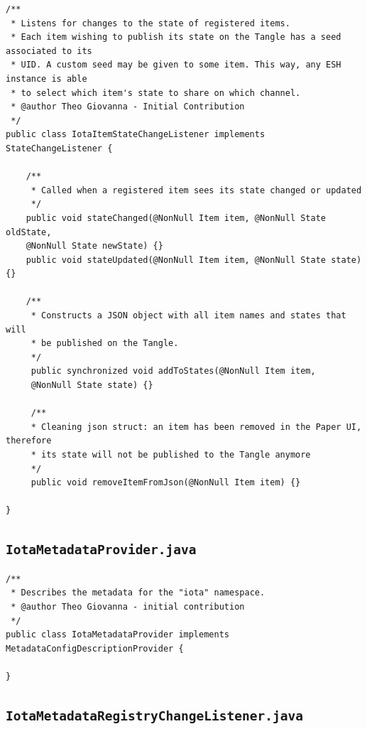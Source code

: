\documentclass[a4paper,10pt]{article}
\begin{document}
\begin{verbatim}
/**
 * Listens for changes to the state of registered items.
 * Each item wishing to publish its state on the Tangle has a seed associated to its 
 * UID. A custom seed may be given to some item. This way, any ESH instance is able 
 * to select which item's state to share on which channel.
 * @author Theo Giovanna - Initial Contribution
 */
public class IotaItemStateChangeListener implements StateChangeListener {

	/**
	 * Called when a registered item sees its state changed or updated
	 */ 
	public void stateChanged(@NonNull Item item, @NonNull State oldState, 
	@NonNull State newState) {}
	public void stateUpdated(@NonNull Item item, @NonNull State state) {}
	
	/**
	 * Constructs a JSON object with all item names and states that will
	 * be published on the Tangle.
	 */
	 public synchronized void addToStates(@NonNull Item item, 
	 @NonNull State state) {}
	 
	 /**
	 * Cleaning json struct: an item has been removed in the Paper UI, therefore 
	 * its state will not be published to the Tangle anymore
	 */
	 public void removeItemFromJson(@NonNull Item item) {}

}
\end{verbatim}

\subsection{\texttt{IotaMetadataProvider.java}}

\begin{verbatim}
/**
 * Describes the metadata for the "iota" namespace.
 * @author Theo Giovanna - initial contribution
 */
public class IotaMetadataProvider implements MetadataConfigDescriptionProvider {

}

\end{verbatim}

\newpage

\subsection{\texttt{IotaMetadataRegistryChangeListener.java}}
\end{document}
